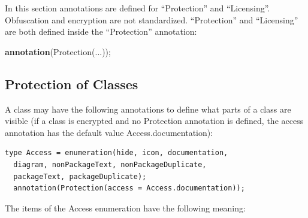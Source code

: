 \documentclass[10pt,a4paper]{report}
\def\doublelabel#1{\label{#1}}
\begin{document}
In this section annotations are defined for ``Protection'' and
``Licensing''. Obfuscation and encryption are not standardized.
``Protection'' and ``Licensing'' are both defined inside the
``Protection'' annotation:

\textbf{annotation}(Protection(...));

\subsection{Protection of Classes}\doublelabel{protection-of-classes}

A class may have the following annotations to define what parts of a
class are visible (if a class is encrypted and no Protection annotation
is defined, the access annotation has the default value
Access.documentation):

\begin{lstlisting}[language=modelica]
  type Access = enumeration(hide, icon, documentation,
  diagram, nonPackageText, nonPackageDuplicate,
  packageText, packageDuplicate);
  annotation(Protection(access = Access.documentation));
\end{lstlisting}
The items of the Access enumeration have the following meaning:
\end{document}
